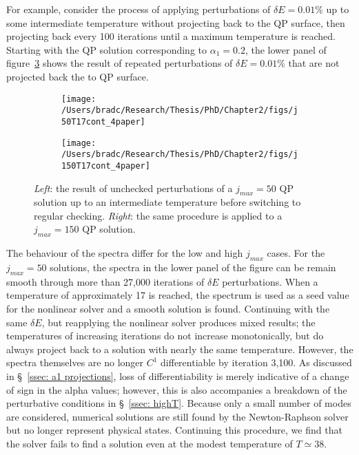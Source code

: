 \documentclass[../PhD.tex]{subfiles}
\begin{document}
\begin{subappendices}
For example, consider the process of applying perturbations of $\delta E = 0.01\%$ up to some intermediate temperature without projecting back to the QP surface, then projecting back every 100 iterations until a maximum temperature is reached. Starting with the QP solution corresponding to $\alpha_1 = 0.2$, the lower panel of figure~\ref{fig: reop check} shows the result of repeated perturbations of $\delta E = 0.01\%$ that are not projected back the to QP surface.

\begin{figure}[h!]
	\centering
	\begin{subfigure}[t]{0.48\textwidth}
		\texttt{[image: /Users/bradc/Research/Thesis/PhD/Chapter2/figs/j50T17cont\_4paper]}
		\label{fig: reop check j50}
	\end{subfigure}
	\;
	\begin{subfigure}[t]{0.48\textwidth}
		\texttt{[image: /Users/bradc/Research/Thesis/PhD/Chapter2/figs/j150T17cont\_4paper]}
		\label{fig: reop check j150}
	\end{subfigure}
\caption[Comparison of spectra and temperatures for different projection frequencies between $j_{max}=50$ and $j_{max} = 150$ solutions]{{\it Left}: the result of unchecked perturbations of a $j_{max} = 50$ QP solution up to an intermediate temperature before switching to regular checking. {\it Right}: the same procedure is applied to a $j_{max}=150$ QP solution.}
\label{fig: reop check}
\end{figure}

The behaviour of the spectra differ for the low and high $j_{max}$ cases. For the $j_{max}=50$ solutions, the spectra in the lower panel of the figure can be remain smooth through more than 27,000 iterations of $\delta E$ perturbations. When a temperature of approximately 17 is reached, the spectrum is used as a seed value for the nonlinear solver and a smooth solution is found. Continuing with the same $\delta E$, but reapplying the nonlinear solver produces mixed results; the temperatures of increasing iterations do not increase monotonically, but do always project back to a solution with nearly the same temperature. However, the spectra themselves are no longer $C^1$ differentiable by iteration 3,100. As discussed in \S~\!\ref{ssec: a1 projections}, loss of differentiability is merely indicative of a change of sign in the alpha values; however, this is also accompanies a breakdown of the perturbative conditions in \S\!~\ref{ssec: highT}. Because only a small number of modes are considered, numerical solutions are still found by the Newton-Raphson solver but no longer represent physical states. Continuing this procedure, we find that the solver fails to find a solution even at the modest temperature of $T \simeq 38$.


\end{subappendices}
\end{document}

